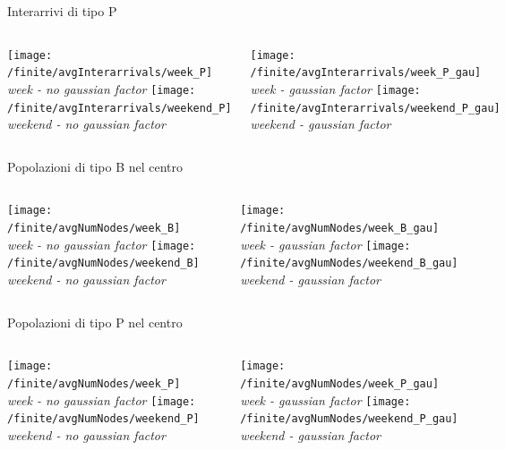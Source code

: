 \documentclass[xcolor=table]{beamer}
\begin{document}
\begin{frame}{Interarrivi di tipo P}
\begin{columns}
\centering
\texttt{[image: /finite/avgInterarrivals/week\_P]}\\
\textit{week - no gaussian factor}
\texttt{[image: /finite/avgInterarrivals/weekend\_P]}\\
\textit{weekend - no gaussian factor}

\centering
\texttt{[image: /finite/avgInterarrivals/week\_P\_gau]}\\
\textit{week - gaussian factor}
\texttt{[image: /finite/avgInterarrivals/weekend\_P\_gau]}\\
\textit{weekend - gaussian factor}
\end{columns}
\end{frame}


\begin{frame}{Popolazioni di tipo B nel centro}
\begin{columns}
\centering
\texttt{[image: /finite/avgNumNodes/week\_B]}\\
\textit{week - no gaussian factor}
\texttt{[image: /finite/avgNumNodes/weekend\_B]}\\
\textit{weekend - no gaussian factor}

\centering
\texttt{[image: /finite/avgNumNodes/week\_B\_gau]}\\
\textit{week - gaussian factor}
\texttt{[image: /finite/avgNumNodes/weekend\_B\_gau]}\\
\textit{weekend - gaussian factor}
\end{columns}
\end{frame}

\begin{frame}{Popolazioni di tipo P nel centro}
\begin{columns}
\centering
\texttt{[image: /finite/avgNumNodes/week\_P]}\\
\textit{week - no gaussian factor}
\texttt{[image: /finite/avgNumNodes/weekend\_P]}\\
\textit{weekend - no gaussian factor}

\centering
\texttt{[image: /finite/avgNumNodes/week\_P\_gau]}\\
\textit{week - gaussian factor}
\texttt{[image: /finite/avgNumNodes/weekend\_P\_gau]}\\
\textit{weekend - gaussian factor}
\end{columns}
\end{frame}
\end{document}
